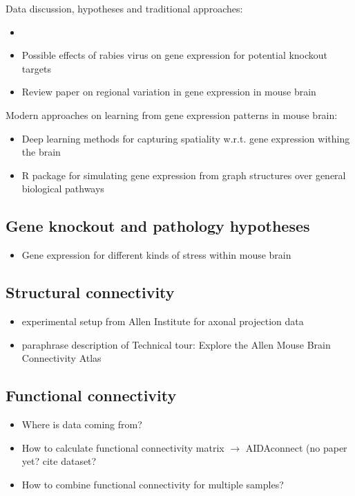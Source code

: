\documentclass[]{article}
\renewcommand{\cite}{\citep}
\begin{document}
Data discussion, hypotheses and traditional approaches:
\begin{itemize}
	\item \cite{noauthor_clustering_nodate}
	\item Possible effects of rabies virus on gene expression\cite{prosniak_effect_2001} for potential knockout targets
	
	\item Review paper on regional variation in gene expression in mouse brain \cite{pavlidis_analysis_2001}
\end{itemize}

Modern approaches on learning from gene expression patterns in mouse brain:
\begin{itemize}
	\item Deep learning methods for capturing spatiality w.r.t. gene expression withing the brain \cite{zeng_deep_2015}
	\item R package for simulating gene expression from graph structures over general biological pathways \cite{kelly_graphsim_2020} 
\end{itemize}

\subsection{Gene knockout and pathology hypotheses}
\begin{itemize}
	\item Gene expression for different kinds of stress within mouse brain \cite{Flati2020}
\end{itemize}

\subsection{Structural connectivity}

\begin{itemize}
	\item experimental setup from Allen Institute for axonal projection data
	\item paraphrase description of \glqq Technical tour: Explore the Allen Mouse Brain Connectivity Atlas\grqq{}
\end{itemize}


\subsection{Functional connectivity}
\begin{itemize}
	\item Where is data coming from? \cite{AIDAmri2019}
	\item How to calculate functional connectivity matrix $\rightarrow$ AIDAconnect (no paper yet? cite dataset?
	\item How to combine functional connectivity for multiple samples? 
\end{itemize}
\end{document}
